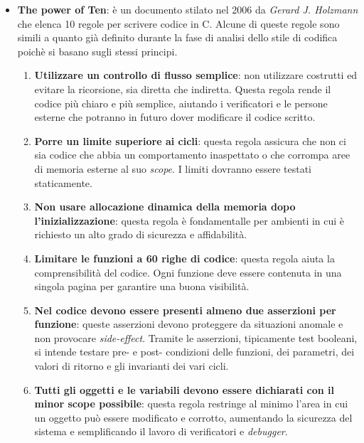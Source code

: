 \begin{itemize}


\item[] \textbf{The power of Ten}: è un documento stilato nel 2006 da \textit{Gerard J. Holzmann} che elenca 10 regole per scrivere codice in C. Alcune di queste regole sono simili a quanto già definito durante la fase di analisi dello stile di codifica poichè si basano sugli stessi principi.

\begin{enumerate}
\item \textbf{Utilizzare un controllo di flusso semplice}: non utilizzare costrutti  ed evitare la ricorsione, sia diretta che indiretta. Questa regola rende il codice più chiaro e più semplice, aiutando i verificatori e le persone esterne che potranno in futuro dover modificare il codice scritto.

\item \textbf{Porre un limite superiore ai cicli}: questa regola assicura che non ci sia codice che abbia un comportamento inaspettato o che corrompa aree di memoria esterne al suo \textit{scope}. I limiti dovranno essere testati staticamente.

\item \textbf{Non usare allocazione dinamica della memoria dopo l'inizializzazione}: questa regola è fondamentalle per ambienti in cui è richiesto un alto grado di sicurezza e affidabilità. 

\item \textbf{Limitare le funzioni a 60 righe di codice}: questa regola aiuta la comprensibilità del codice. Ogni funzione deve essere contenuta in una singola pagina per garantire una buona visibilità.

\item \textbf{Nel codice devono essere presenti almeno due asserzioni per funzione}: queste asserzioni devono proteggere da situazioni anomale e non provocare \textit{side-effect}. Tramite le asserzioni, tipicamente test booleani, si intende testare pre-  e post- condizioni delle funzioni, dei parametri, dei valori di ritorno e gli invarianti dei vari cicli.

\item \textbf{Tutti gli oggetti e le variabili devono essere dichiarati con il minor scope possibile}: questa regola restringe al minimo l'area in cui un oggetto può essere modificato e corrotto, aumentando la sicurezza del sistema e semplificando il lavoro di verificatori e \textit{debugger}.


\end{enumerate}
\end{itemize}
